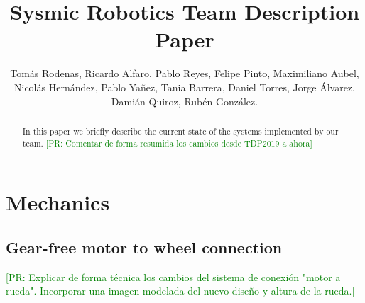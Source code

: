 \documentclass{llncs}
\newcommand{\PR}[1]{{\textcolor{green}{[PR: #1]}}}  %
\begin{document}
\tracingall
\mainmatter

\title{Sysmic Robotics Team Description Paper}

\author{Tom\'as Rodenas, Ricardo Alfaro,  Pablo Reyes, Felipe Pinto, Maximiliano Aubel, Nicolás Hernández, Pablo Yañez, Tania Barrera, Daniel Torres, Jorge Álvarez, Damián Quiroz, Rubén González.}
%
%

\maketitle

\begin{abstract}
    In this paper we briefly describe the current state of the systems implemented by our team. \PR{Comentar de forma resumida los cambios desde TDP2019 a ahora}
\end{abstract}


\section{Mechanics}

\subsection{Gear-free motor to wheel connection}

\PR{Explicar de forma técnica los cambios del sistema de conexión "motor a rueda". Incorporar una imagen modelada del nuevo diseño y altura de la rueda.}
\end{document}
